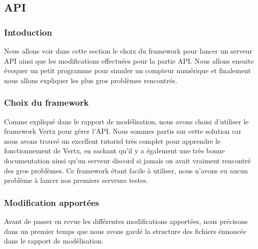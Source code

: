 \subsection{API}
\subsubsection{Intoduction}

\begin{flushleft}
Nous allons voir dans cette section le choix du framework pour lancer un serveur API ainsi que les modifications effectuées pour la partie API. Nous allons ensuite évoquer un petit programme pour simuler un compteur numérique et finalement nous allons expliquer les plus gros problèmes rencontrés.
\end{flushleft}

\subsubsection{Choix du framework}

\begin{flushleft}
Comme expliqué dans le rapport de modélisation, nous avons choisi d'utiliser le framework Vertx pour gérer l'API. Nous sommes partis sur cette solution car nous avons trouvé un excellent tutoriel très complet pour apprendre le fonctionnement de Vertx, en sachant qu'il y a également une très bonne documentation ainsi qu'un serveur discord si jamais on avait vraiment rencontré des gros problèmes. Ce framework étant facile à utiliser, nous n'avons eu aucun problème à lancer nos premiers serveurs testes.
\end{flushleft}

\subsubsection{Modification apportées}

\begin{flushleft}
Avant de passer en revue les différentes modifications apportées, nous précisons dans un premier temps que nous avons gardé la structure des fichiers énnoncée dans le rapport de modélisation. 
\end{flushleft}

